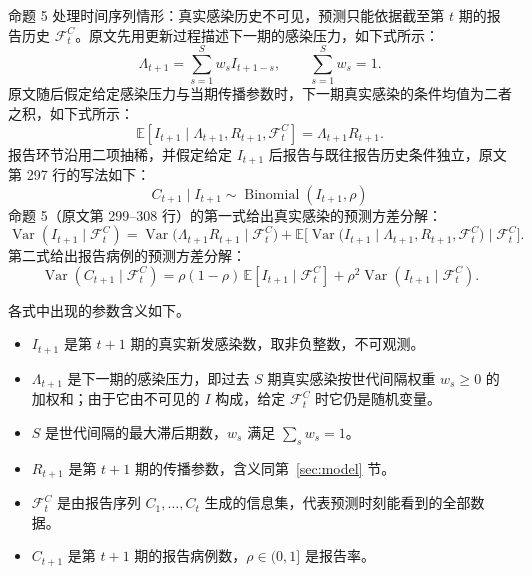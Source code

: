 命题 5 处理时间序列情形：真实感染历史不可见，预测只能依据截至第 $t$ 期的报告历史 $\mathcal F_t^C$。原文先用更新过程描述下一期的感染压力，如下式所示：
\begin{equation*}
\Lambda_{t+1} = \sum_{s=1}^S w_s I_{t+1-s}, \qquad \sum_{s=1}^S w_s = 1.
\tag{原文式 19}
\end{equation*}
原文随后假定给定感染压力与当期传播参数时，下一期真实感染的条件均值为二者之积，如下式所示：
\begin{equation*}
\mathbb{E}[I_{t+1} \mid \Lambda_{t+1}, R_{t+1}, \mathcal{F}_t^C] = \Lambda_{t+1} R_{t+1}.
\tag{原文式 20}
\end{equation*}
报告环节沿用二项抽稀，并假定给定 $I_{t+1}$ 后报告与既往报告历史条件独立，原文第 297 行的写法如下：
\begin{equation*}
C_{t+1} \mid I_{t+1} \sim \operatorname{Binomial}(I_{t+1}, \rho)
\tag*{原文第 297 行}
\end{equation*}
命题 5（原文第 299–308 行）的第一式给出真实感染的预测方差分解：
\begin{equation*}
\operatorname{Var}(I_{t+1} \mid \mathcal{F}_t^C) = \operatorname{Var}\big(\Lambda_{t+1} R_{t+1} \;\big|\; \mathcal{F}_t^C\big) + \mathbb{E}\Big[\operatorname{Var}\big(I_{t+1} \;\big|\; \Lambda_{t+1}, R_{t+1}, \mathcal{F}_t^C\big) \;\Big|\; \mathcal{F}_t^C\Big].
\tag{原文式 21}
\end{equation*}
第二式给出报告病例的预测方差分解：
\begin{equation*}
\operatorname{Var}(C_{t+1} \mid \mathcal{F}_t^C) = \rho(1 - \rho)\,\mathbb{E}[I_{t+1} \mid \mathcal{F}_t^C] + \rho^2 \operatorname{Var}(I_{t+1} \mid \mathcal{F}_t^C).
\tag{原文式 22}
\end{equation*}

各式中出现的参数含义如下。
\begin{itemize}
\item $I_{t+1}$ 是第 $t+1$ 期的真实新发感染数，取非负整数，不可观测。
\item $\Lambda_{t+1}$ 是下一期的感染压力，即过去 $S$ 期真实感染按世代间隔权重 $w_s\ge0$ 的加权和；由于它由不可见的 $I$ 构成，给定 $\mathcal F_t^C$ 时它仍是随机变量。
\item $S$ 是世代间隔的最大滞后期数，$w_s$ 满足 $\sum_sw_s=1$。
\item $R_{t+1}$ 是第 $t+1$ 期的传播参数，含义同第~\ref{sec:model} 节。
\item $\mathcal F_t^C$ 是由报告序列 $C_1,\dots,C_t$ 生成的信息集，代表预测时刻能看到的全部数据。
\item $C_{t+1}$ 是第 $t+1$ 期的报告病例数，$\rho\in(0,1]$ 是报告率。
\end{itemize}

